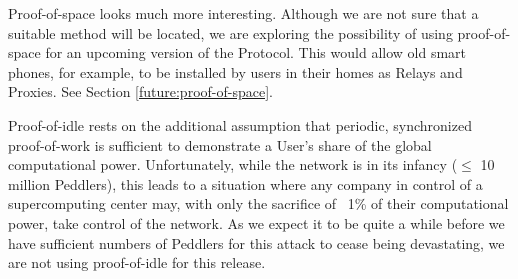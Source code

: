 Proof-of-space looks much more interesting. Although we are not sure that a suitable method will be located, we are exploring the possibility of using proof-of-space for an upcoming version of the \Orchid{} Protocol. This would allow old smart phones, for example, to be installed by users in their homes as Relays and Proxies. See Section \ref{future:proof-of-space}.

Proof-of-idle rests on the additional assumption that periodic, synchronized proof-of-work is sufficient to demonstrate a User’s share of the global computational power. Unfortunately, while the network is in its infancy ($\leq$ 10 million Peddlers), this leads to a situation where any company in control of a supercomputing center may, with only the sacrifice of ~1\% of their computational power, take control of the network. As we expect it to be quite a while before we have sufficient numbers of Peddlers for this attack to cease being devastating, we are not using proof-of-idle for this release.
